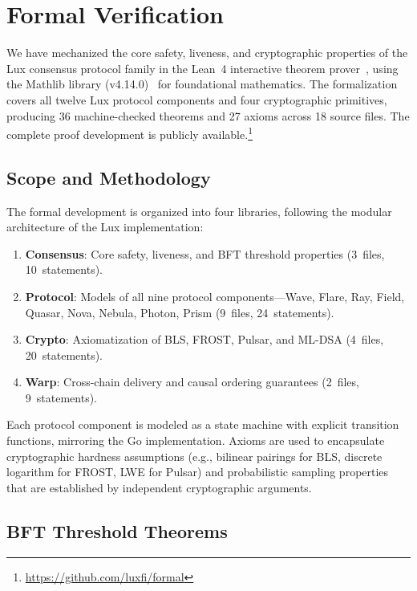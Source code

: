 \section{Formal Verification}

\label{sec:formal}

We have mechanized the core safety, liveness, and cryptographic properties of the Lux
consensus protocol family in the Lean~4 interactive theorem prover~\cite{moura2021lean4},
using the Mathlib library (v4.14.0)~\cite{mathlib4} for foundational mathematics. The
formalization covers all twelve Lux protocol components and four cryptographic primitives,
producing 36 machine-checked theorems and 27 axioms across 18 source files.
The complete proof development is publicly available.\footnote{\url{https://github.com/luxfi/formal}}

\subsection{Scope and Methodology}

The formal development is organized into four libraries, following the modular
architecture of the Lux implementation:

\begin{enumerate}
\item \textbf{Consensus}: Core safety, liveness, and BFT threshold properties
(3~files, 10~statements).
\item \textbf{Protocol}: Models of all nine protocol components---Wave, Flare,
Ray, Field, Quasar, Nova, Nebula, Photon, Prism (9~files, 24~statements).
\item \textbf{Crypto}: Axiomatization of BLS, FROST, Pulsar, and ML-DSA
(4~files, 20~statements).
\item \textbf{Warp}: Cross-chain delivery and causal ordering guarantees
(2~files, 9~statements).
\end{enumerate}

Each protocol component is modeled as a state machine with explicit transition
functions, mirroring the Go implementation. Axioms are used to encapsulate cryptographic
hardness assumptions (e.g., bilinear pairings for BLS, discrete logarithm for FROST,
LWE for Pulsar) and probabilistic sampling properties that are established by
independent cryptographic arguments.

\subsection{BFT Threshold Theorems}

